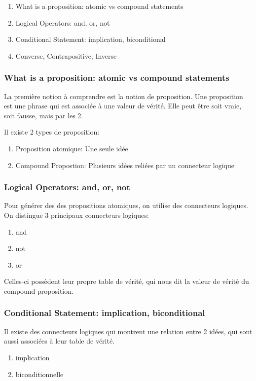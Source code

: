 \documentclass{article}
\begin{document}
\begin{enumerate}
    \item What is a proposition: atomic vs compound statements
    \item Logical Operators: and, or, not
    \item Conditional Statement: implication, biconditional
    \item Converse, Contrapositive, Inverse
\end{enumerate}

\subsubsection{What is a proposition: atomic vs compound statements}

La première notion à comprendre est la notion de proposition. Une
proposition est une phrase qui est associée à une valeur de vérité.
Elle peut être soit vraie, soit fausse, mais par les 2.

Il existe 2 types de proposition:
\begin{enumerate}
    \item Proposition atomique: Une seule idée
    \item Compound Propostion: Plusieurs idées reliées par un connecteur
	logique
\end{enumerate}

\subsubsection{Logical Operators: and, or, not}

Pour générer des des propositions atomiques, on utilise des connecteurs
logiques. On distingue 3 principaux connecteurs logiques:
\begin{enumerate}
    \item and
    \item not
    \item or
\end{enumerate}

Celles-ci possèdent leur propre table de vérité, qui nous dit la valeur
de vérité du compound proposition.

\subsubsection{Conditional Statement: implication, biconditional}

Il existe des connecteurs logiques qui montrent une relation entre 2 idées,
qui sont aussi associées à leur table de vérité.
\begin{enumerate}
    \item implication
    \item biconditionnelle
\end{enumerate}
\end{document}
